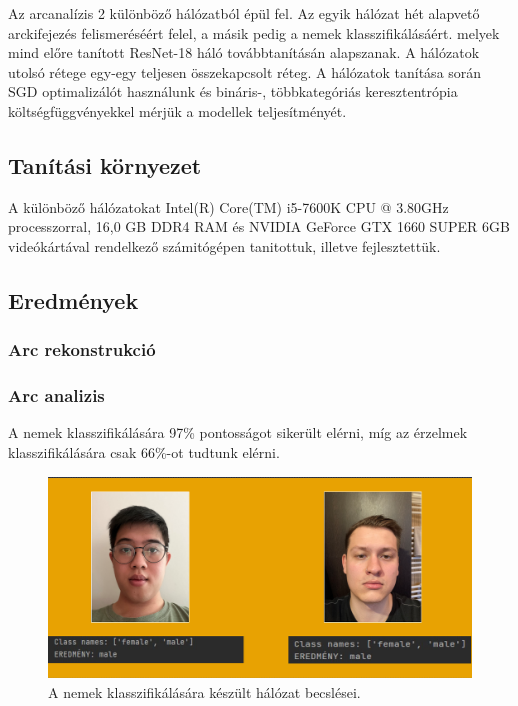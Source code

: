 \documentclass[12pt,a4]{article}
\begin{document}
    Az arcanalízis 2 különböző hálózatból épül fel. Az egyik hálózat hét alapvető arckifejezés felismeréséért felel, a másik pedig a nemek klasszifikálásáért.
    melyek mind előre tanított ResNet-18 háló továbbtanításán alapszanak.
    A hálózatok utolsó rétege egy-egy teljesen összekapcsolt réteg.
    A hálózatok tanítása során SGD optimalizálót használunk és bináris-, többkategóriás keresztentrópia költségfüggvényekkel mérjük a modellek teljesítményét.
    
	\subsection{Tanítási környezet}

    A különböző hálózatokat Intel(R) Core(TM) i5-7600K CPU @ 3.80GHz processzorral, 16,0 GB DDR4 RAM és NVIDIA GeForce GTX 1660 SUPER 6GB videókártával rendelkező számitógépen tanitottuk, illetve fejlesztettük.

    \subsection{Eredmények}
    \subsubsection{Arc rekonstrukció}
    \subsubsection{Arc analizis}
    A nemek klasszifikálására 97\% pontosságot sikerült elérni, míg az érzelmek klasszifikálására csak 66\%-ot tudtunk elérni.

    \begin{figure}[h]	
		\centering
		\includegraphics[width=1\linewidth]{gender}
        \caption{  A nemek klasszifikálására készült hálózat becslései.}
        \label{fig:gender}
	\end{figure}
\end{document}
